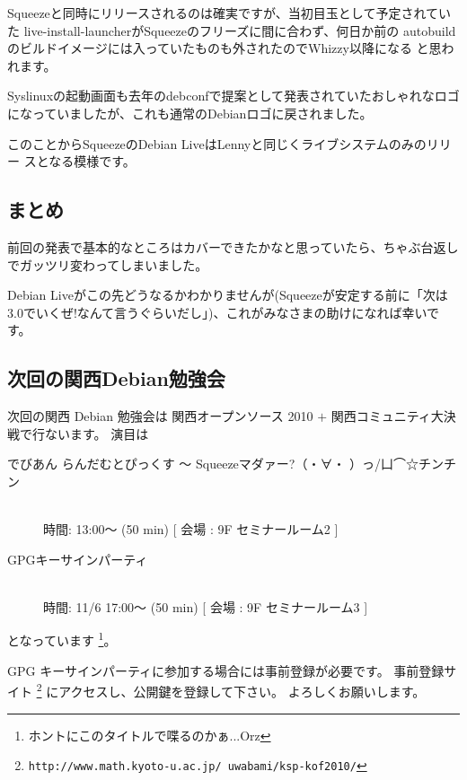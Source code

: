 \documentclass[mingoth,a4paper]{jsarticle}
\begin{document}
Squeezeと同時にリリースされるのは確実ですが、当初目玉として予定されていた
live-install-launcherがSqueezeのフリーズに間に合わず、何日か前の
autobuildのビルドイメージには入っていたものも外されたのでWhizzy以降になる
と思われます。

Syslinuxの起動画面も去年のdebconfで提案として発表されていたおしゃれなロゴ
になっていましたが、これも通常のDebianロゴに戻されました。

このことからSqueezeのDebian LiveはLennyと同じくライブシステムのみのリリー
スとなる模様です。

\subsection{まとめ}
前回の発表で基本的なところはカバーできたかなと思っていたら、ちゃぶ台返し
でガッツリ変わってしまいました。

Debian Liveがこの先どうなるかわかりませんが(Squeezeが安定する前に「次は
3.0でいくぜ!なんて言うぐらいだし」)、これがみなさまの助けになれば幸いです。


\subsection{次回の関西Debian勉強会}
次回の関西 Debian 勉強会は
関西オープンソース 2010 $+$ 関西コミュニティ大決戦で行ないます。
演目は
\begin{description}
      \item[でびあん らんだむとぴっくす 〜 Squeezeマダァー?（・∀・ ）っ/凵⌒☆チンチン]　\\
    時間: 13:00〜 (50 min) [ 会場 : 9F セミナールーム2 ]
      \item[GPGキーサインパーティ]　\\
    時間: 11/6 17:00〜 (50 min) [ 会場 : 9F セミナールーム3 ]
\end{description}
となっています%
\footnote{ホントにこのタイトルで喋るのかぁ...Orz}。

GPG キーサインパーティに参加する場合には事前登録が必要です。
事前登録サイト%
\footnote{{\tt{http://www.math.kyoto-u.ac.jp/~uwabami/ksp-kof2010/}}}
にアクセスし、公開鍵を登録して下さい。 よろしくお願いします。



\printindex
 \cleartooddpage
\end{document}
